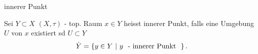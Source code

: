 \documentclass[class=article, crop=false]{standalone}
\begin{document}
\begin{zettel}{innerer Punkt}
\begin{flashcard}
\begin{definition}
    Sei $Y \subset X$ $(X, \tau )$ - top. Raum $x \in  Y$ heisst innerer Punkt, falls eine Umgebung $U$ von $x$ existiert sd $U \subset Y$ 
    \[
        \dot{Y} = \set{y \in  Y}{y \tx{ - innerer Punkt } }
    .\]
\end{definition}
\end{flashcard}
\end{zettel}
\end{document}
